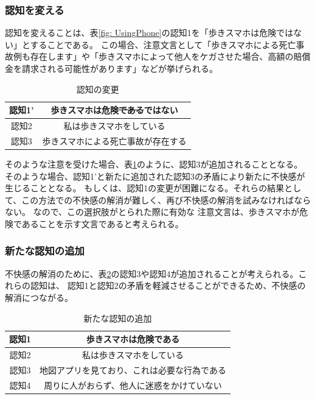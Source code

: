 \documentclass[11pt,a4j]{jreport}
\begin{document}
\subsubsection{認知を変える}
認知を変えることは、表\ref{fig: UsingPhone}の認知1を「歩きスマホは危険ではない」とすることである。
この場合、注意文言として「歩きスマホによる死亡事故例も存在します」や「歩きスマホによって他人をケガさせた場合、高額の賠償金を請求される可能性があります」などが挙げられる。
\begin{table}[h]
  \centering
  
  \label{fig: AvoidDissonanceRevise}
  \begin{tabular}{c|c}
      認知1' & 歩きスマホは危険\sout{である}ではない \\ \hline
      認知2 & 私は歩きスマホをしている \\ \hline
      認知3 & 歩きスマホによる死亡事故が存在する \\
  \end{tabular}
  \caption{認知の変更}
\end{table}
そのような注意を受けた場合、表\ref{fig: AvoidDissonanceRevise}のように、認知3が追加されることとなる。
そのような場合、認知1'と新たに追加された認知3の矛盾により新たに不快感が生じることとなる。
もしくは、認知1の変更が困難になる。それらの結果として、この方法での不快感の解消が難しく、再び不快感の解消を試みなければならない。
なので、この選択肢がとられた際に有効な
注意文言は、歩きスマホが危険であることを示す文言であると考えられる。
\subsubsection{新たな認知の追加}
不快感の解消のために、表\ref{fig: AvoidDissonance}の認知3や認知4が追加されることが考えられる。これらの認知は、
認知1と認知2の矛盾を軽減させることができるため、不快感の解消につながる。
\begin{table}[h]
  \centering
  
  \label{fig: AvoidDissonance}
  \begin{tabular}{c|c}
      認知1 & 歩きスマホは危険である \\ \hline
      認知2 & 私は歩きスマホをしている \\ \hline
      認知3 & 地図アプリを見ており、これは必要な行為である \\\hline
      認知4 & 周りに人がおらず、他人に迷惑をかけていない \\ 
  \end{tabular}
  \caption{新たな認知の追加}
\end{table}
\end{document}
